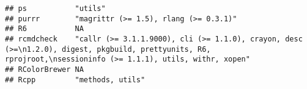 \documentclass[]{book}
\begin{document}
\begin{verbatim}
## ps           "utils"                                                                                                                                                                                                                                                                                                                                                                                                                                                                                                     
## purrr        "magrittr (>= 1.5), rlang (>= 0.3.1)"                                                                                                                                                                                                                                                                                                                                                                                                                                                                       
## R6           NA                                                                                                                                                                                                                                                                                                                                                                                                                                                                                                          
## rcmdcheck    "callr (>= 3.1.1.9000), cli (>= 1.1.0), crayon, desc (>=\n1.2.0), digest, pkgbuild, prettyunits, R6, rprojroot,\nsessioninfo (>= 1.1.1), utils, withr, xopen"                                                                                                                                                                                                                                                                                                                                               
## RColorBrewer NA                                                                                                                                                                                                                                                                                                                                                                                                                                                                                                          
## Rcpp         "methods, utils"                                                                                                                                                                                                                                                                                                                                                                                                                                                                                            

\end{verbatim}
\end{document}
